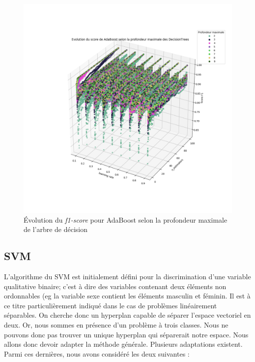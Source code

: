 \documentclass[a4paper]{report}
\begin{document}
\begin{figure}
\centering
\includegraphics[width=\textwidth]{img/adaboost_depth.png}
\caption{Évolution du \emph{f1-score} pour AdaBoost selon la profondeur maximale de l'arbre de décision\label{adaboost_depth}}
\end{figure}

\subsection{SVM}

L'algorithme du SVM est initialement défini pour la discrimination d'une variable qualitative binaire; c'est à dire des variables contenant deux éléments non ordonnables (eg la variable sexe contient les éléments masculin et féminin. Il est à ce titre particulièrement indiqué dans le cas de problèmes linéairement séparables. On cherche donc un hyperplan capable de séparer l'espace vectoriel en deux. Or, nous sommes en présence d'un problème à trois classes. Nous ne pouvons donc pas trouver un unique hyperplan qui séparerait notre espace. Nous allons donc devoir adapter la méthode générale. Plusieurs adaptations existent. Parmi ces dernières, nous avons considéré les deux suivantes :
\end{document}
